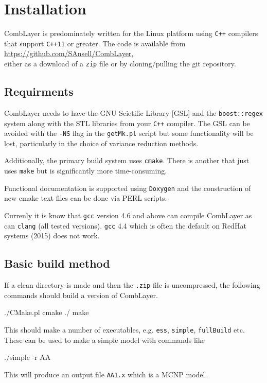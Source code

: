 \section{Installation}

CombLayer is predominately written for the Linux platform using {\tt C++}
compilers that support {\tt C++11} or greater. The code is available from \\
\href{https://github.com/SAnsell/CombLayer}{https://github.com/SAnsell/CombLayer}, \\ either as a download of a {\tt zip} file or
by cloning/pulling the git repository.

\subsection{Requirments}

CombLayer needs to have the GNU Scietific Library [GSL] and the
{\tt boost::regex} system along with the STL libraries from your {\tt C++}
compiler. The GSL can be avoided with the {\tt -NS} flag in the {\tt getMk.pl}  script
but some functionality will be lost, particularly in the choice
of variance reduction methods.

Additionally, the primary build system uses {\tt cmake}. There is another
that just uses {\tt make} but is significantly more time-consuming.

Functional documentation is supported using {\tt Doxygen} and the construction
of new cmake text files can be done via PERL scripts.

Currenly it is know that {\tt gcc} version 4.6 and above can compile
CombLayer as can {\tt clang} (all tested versions). {\tt gcc} 4.4 which is often
the default on RedHat systems (2015) does not work.

\subsection{Basic build method}

If a clean directory is made and then the {\tt .zip} file is uncompressed, the
following commands should build a version of CombLayer.

\begin{bash}
  ./CMake.pl
  cmake ./
  make
\end{bash}

This should make a number of executables, e.g. {\tt ess}, {\tt simple}, {\tt fullBuild} etc. These
can be used to make a simple model with commands like
\begin{bash}
  ./simple -r AA
\end{bash}
This will produce an output file {\tt AA1.x} which is a MCNP model.



